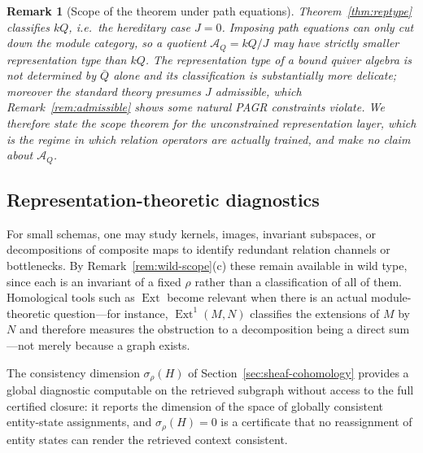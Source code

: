 \documentclass[11pt]{article}
\newtheorem{remark}[definition]{Remark}
\newcommand{\A}{\mathcal{A}}
\begin{document}
\begin{remark}[Scope of the theorem under path equations]
\label{rem:reptype-bound}
Theorem~\ref{thm:reptype} classifies $kQ$, i.e.\ the hereditary case $J=0$. Imposing path equations can only cut down the module category, so a quotient $\A_Q=kQ/J$ may have strictly smaller representation type than $kQ$. The representation type of a bound quiver algebra is \emph{not} determined by $\bar Q$ alone and its classification is substantially more delicate; moreover the standard theory presumes $J$ admissible, which Remark~\ref{rem:admissible} shows some natural PAGR constraints violate. We therefore state the scope theorem for the unconstrained representation layer, which is the regime in which relation operators are actually trained, and make no claim about $\A_Q$.
\end{remark}

\subsection{Representation-theoretic diagnostics}
\label{sec:diagnostics}
For small schemas, one may study kernels, images, invariant subspaces, or decompositions of composite maps to identify redundant relation channels or bottlenecks. By Remark~\ref{rem:wild-scope}(c) these remain available in wild type, since each is an invariant of a fixed $\rho$ rather than a classification of all of them. Homological tools such as $\operatorname{Ext}$ become relevant when there is an actual module-theoretic question---for instance, $\operatorname{Ext}^1(M,N)$ classifies the extensions of $M$ by $N$ and therefore measures the obstruction to a decomposition being a direct sum---not merely because a graph exists.

The consistency dimension $\sigma_\rho(H)$ of Section~\ref{sec:sheaf-cohomology} provides a global diagnostic computable on the retrieved subgraph without access to the full certified closure: it reports the dimension of the space of globally consistent entity-state assignments, and $\sigma_\rho(H)=0$ is a certificate that no reassignment of entity states can render the retrieved context consistent.
\end{document}
